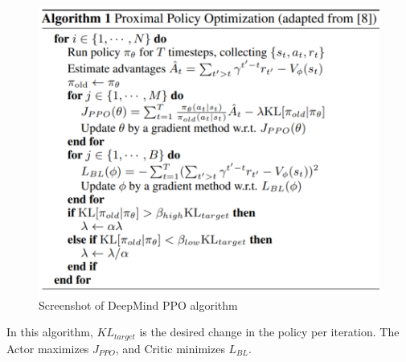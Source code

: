 \documentclass[lang=en,mode=normal,device=normal,color=blue,12pt]{elegantnote}
\DeclareMathOperator*{\1}{\mathbbm{1}}
\begin{document}
\begin{figure}[!ht]
  \centering
  \includegraphics[width=0.7\linewidth]{ppo.PNG}
  \caption{Screenshot of DeepMind PPO algorithm}
  \label{fig:ppo}
\end{figure}

In this algorithm, $KL_{target}$ is the desired change in the policy per iteration.
The Actor maximizes $J_{PPO}$, and Critic minimizes $L_{BL}$.











\end{document}
